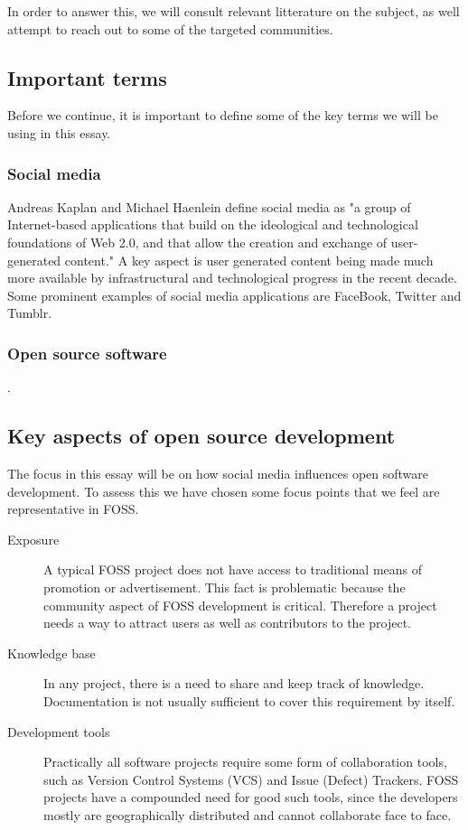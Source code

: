 \documentclass[a4paper,11pt]{article} %
\begin{document}
In order to answer this, we will consult relevant litterature on the
subject, as well attempt to reach out to some of the targeted communities.

\subsection{Important terms}
Before we continue, it is important to define some of the key terms we will
be using in this essay.

\subsubsection*{Social media}
Andreas Kaplan and Michael Haenlein define social media as "a group of
Internet-based applications that build on the ideological and technological
foundations of Web 2.0, and that allow the creation and exchange of
user-generated content."\cite{Kaplan201059} A key aspect is user generated
content being made much more available by infrastructural and technological
progress in the recent decade. Some prominent examples of social media
applications are FaceBook, Twitter and Tumblr.
\subsubsection*{Open source software}
\cite{leister2014opensource}.

\subsection{Key aspects of open source development}

The focus in this essay will be on how social media influences open software
development. To assess this we have chosen some focus points that we feel
are representative in FOSS.

\begin{description}
\item[Exposure] \hfill
  
  A typical FOSS project does not have access to traditional means of
  promotion or advertisement. This fact is problematic because the community
  aspect of FOSS development is critical. Therefore a project needs a way to
  attract users as well as contributors to the project.
\item[Knowledge base] \hfill

  In any project, there is a need to share and keep track of
  knowledge. Documentation is not usually sufficient to cover this
  requirement by itself.
\item[Development tools] \hfill
  
  Practically all software projects require some form of collaboration
  tools, such as Version Control Systems (VCS) and Issue (Defect)
  Trackers. FOSS projects have a compounded need for good such tools, since
  the developers mostly are geographically distributed and cannot
  collaborate face to face.
\end{description}
\end{document}
